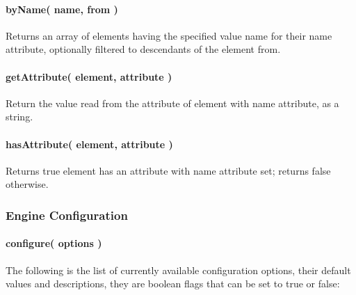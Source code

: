 \paragraph*{{\ttfamily by\+Name( name, from )}}

Returns an array of elements having the specified value {\ttfamily name} for their name attribute, optionally filtered to descendants of the element {\ttfamily from}.

\paragraph*{{\ttfamily get\+Attribute( element, attribute )}}

Return the value read from the attribute of {\ttfamily element} with name {\ttfamily attribute}, as a string.

\paragraph*{{\ttfamily has\+Attribute( element, attribute )}}

Returns true {\ttfamily element} has an attribute with name {\ttfamily attribute} set; returns {\ttfamily false} otherwise.

\subsubsection*{Engine Configuration}

\paragraph*{{\ttfamily configure( options )}}

The following is the list of currently available configuration options, their default values and descriptions, they are boolean flags that can be set to {\ttfamily true} or {\ttfamily false}\+:


